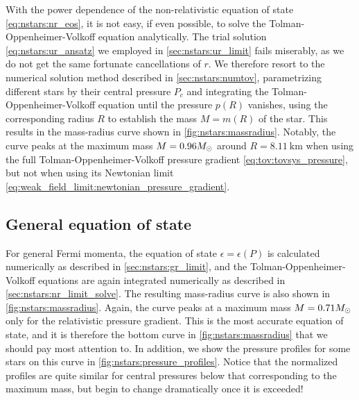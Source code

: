 With the power dependence of the non-relativistic equation of state \eqref{eq:nstars:nr_eos}, it is not easy, if even possible, to solve the Tolman-Oppenheimer-Volkoff equation analytically.
The trial solution \eqref{eq:nstars:ur_ansatz} we employed in \cref{sec:nstars:ur_limit} fails miserably, as we do not get the same fortunate cancellations of $r$.
We therefore resort to the numerical solution method described in \cref{sec:nstars:numtov}, parametrizing different stars by their central pressure $P_c$ and integrating the Tolman-Oppenheimer-Volkoff equation until the pressure $p(R)$ vanishes, using the corresponding radius $R$ to establish the mass $M = m(R)$ of the star.
This results in the mass-radius curve shown in \cref{fig:nstars:massradius}.
Notably, the curve peaks at the maximum mass $M = 0.96 M_\odot$ around $R = \SI{8.11}{\kilo\meter}$ when using the full Tolman-Oppenheimer-Volkoff pressure gradient \eqref{eq:tov:tovsys_pressure}, but not when using its Newtonian limit \eqref{eq:weak_field_limit:newtonian_pressure_gradient}.

\subsection{General equation of state}

For general Fermi momenta, the equation of state $\epsilon = \epsilon(P)$ is calculated numerically as described in \cref{sec:nstars:gr_limit}, and the Tolman-Oppenheimer-Volkoff equations are again integrated numerically as described in \cref{sec:nstars:nr_limit_solve}.
The resulting mass-radius curve is also shown in \cref{fig:nstars:massradius}.
Again, the curve peaks at a maximum mass $M = 0.71 M_\odot$ only for the relativistic pressure gradient.
This is the most accurate equation of state, and it is therefore the bottom curve in \cref{fig:nstars:massradius} that we should pay most attention to.
In addition, we show the pressure profiles for some stars on this curve in \cref{fig:nstars:pressure_profiles}.
Notice that the normalized profiles are quite similar for central pressures below that corresponding to the maximum mass, but begin to change dramatically once it is exceeded!

\pgfmathsetmacro{\maxRnr}{\pgfmathresult}
\pgfmathsetmacro{\maxRgr}{\pgfmathresult}

